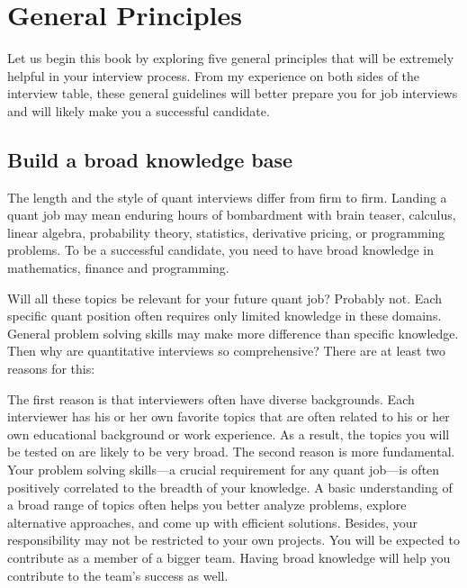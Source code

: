 
\section{General Principles}

Let us begin this book by exploring five general principles that will be extremely helpful
in your interview process. From my experience on both sides of the interview table,
these general guidelines will better prepare you for job interviews and will likely make
you a successful candidate.

\subsection{Build a broad knowledge base}

The length and the style of quant interviews differ from firm to firm. Landing a quant
job may mean enduring hours of bombardment with brain teaser, calculus, linear algebra,
probability theory, statistics, derivative pricing, or programming problems. To be a
successful candidate, you need to have broad knowledge in mathematics, finance and
programming.

Will all these topics be relevant for your future quant job? Probably not. Each specific
quant position often requires only limited knowledge in these domains. General problem
solving skills may make more difference than specific knowledge. Then why are
quantitative interviews so comprehensive? There are at least two reasons for this:

The first reason is that interviewers often have diverse backgrounds. Each interviewer
has his or her own favorite topics that are often related to his or her own educational
background or work experience. As a result, the topics you will be tested on are likely to
be very broad. The second reason is more fundamental. Your problem solving skills---a
crucial requirement for any quant job---is often positively correlated to the breadth of
your knowledge. A basic understanding of a broad range of topics often helps you better
analyze problems, explore alternative approaches, and come up with efficient solutions.
Besides, your responsibility may not be restricted to your own projects. You will be
expected to contribute as a member of a bigger team. Having broad knowledge will help
you contribute to the team's success as well.

